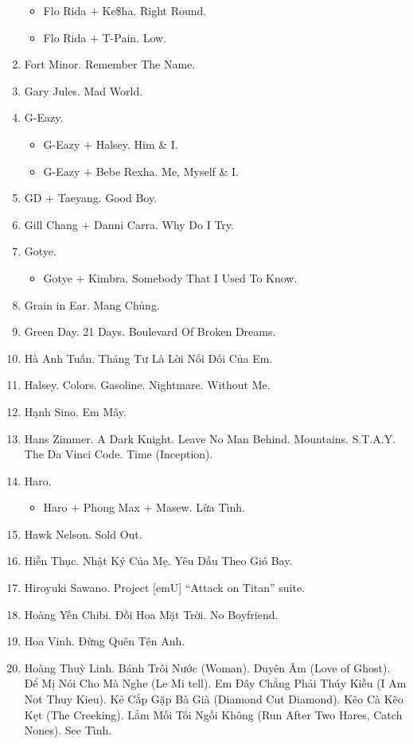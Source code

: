 \documentclass{article}
\begin{document}
\begin{enumerate}
\begin{itemize}
		\item {\sc Flo Rida $+$ Ke\$ha.} Right Round.
		\item {\sc Flo Rida $+$ T-Pain.} Low.
	\end{itemize}
	\item {\sc Fort Minor.} Remember The Name.
	\item {\sc Gary Jules.} Mad World.
	\item {\sc G-Eazy.}
	\begin{itemize}
		\item {\sc G-Eazy $+$ Halsey.} Him \& I.
		\item {\sc G-Eazy $+$ Bebe Rexha.} Me, Myself \& I.
	\end{itemize}	
	\item {\sc GD $+$ Taeyang.} Good Boy.
	\item {\sc Gill Chang $+$ Danni Carra.} Why Do I Try.
	\item {\sc Gotye.}
	\begin{itemize}
		\item {\sc Gotye $+$ Kimbra.} Somebody That I Used To Know.
	\end{itemize}
	\item {\sc Grain in Ear.} Mang Chủng.
	\item {\sc Green Day.} 21 Days. Boulevard Of Broken Dreams.
	\item {\sc Hà Anh Tuấn.} Tháng Tư Là Lời Nối Dối Của Em.
	\item {\sc Halsey.} Colors. Gasoline. Nightmare. Without Me.
	\item {\sc Hạnh Sino.} Em Mây.
	\item {\sc Hans Zimmer.} A Dark Knight. Leave No Man Behind. Mountains. S.T.A.Y. The Da Vinci Code. Time (Inception).
	\item {\sc Haro.}
	\begin{itemize}
		\item {\sc Haro $+$ Phong Max $+$ Masew.} Lừa Tình.
	\end{itemize}
	\item {\sc Hawk Nelson.} Sold Out.
	\item {\sc Hiền Thục.} Nhật Ký Của Mẹ. Yêu Dấu Theo Gió Bay.
	\item {\sc Hiroyuki Sawano.} Project [emU] ``Attack on Titan'' suite.
	\item {\sc Hoàng Yến Chibi.} Đồi Hoa Mặt Trời. No Boyfriend.
	\item {\sc Hoa Vinh.} Đừng Quên Tên Anh.
	\item {\sc Hoàng Thuỳ Linh.} Bánh Trôi Nước (Woman). Duyên Âm (Love of Ghost). Để Mị Nói Cho Mà Nghe (Le Mi tell). Em Đây Chẳng Phải Thúy Kiều (I Am Not Thuy Kieu). Kẻ Cắp Gặp Bà Già (Diamond Cut Diamond). Kẽo Cà Kẽo Kẹt (The Creeking). Lắm Mối Tối Ngồi Không (Run After Two Hares, Catch Nones). See Tình.

\end{enumerate}
\end{document}
